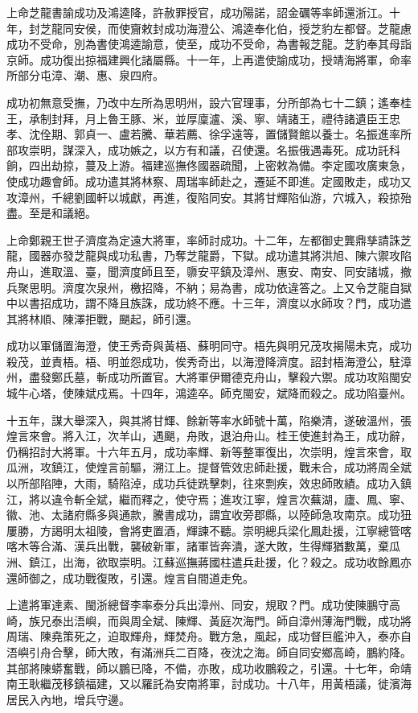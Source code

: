 \begin{pinyinscope}
上命芝龍書諭成功及鴻逵降，許赦罪授官，成功陽諾，詔金礪等率師還浙江。十年，封芝龍同安侯，而使齎敕封成功海澄公、鴻逵奉化伯，授芝豹左都督。芝龍慮成功不受命，別為書使鴻逵諭意，使至，成功不受命，為書報芝龍。芝豹奉其母詣京師。成功復出掠福建興化諸屬縣。十一年，上再遣使諭成功，授靖海將軍，命率所部分屯漳、潮、惠、泉四府。

成功初無意受撫，乃改中左所為思明州，設六官理事，分所部為七十二鎮；遙奉桂王，承制封拜，月上魯王豚、米，並厚廩瀘、溪、寧、靖諸王，禮待諸遺臣王忠孝、沈佺期、郭貞一、盧若騰、華若薦、徐孚遠等，置儲賢館以養士。名振進率所部攻崇明，謀深入，成功嫉之，以方有和議，召使還。名振俄遇毒死。成功託科餉，四出劫掠，蔓及上游。福建巡撫佟國器疏聞，上密敕為備。李定國攻廣東急，使成功趣會師。成功遣其將林察、周瑞率師赴之，遷延不即進。定國敗走，成功又攻漳州，千總劉國軒以城獻，再進，復陷同安。其將甘輝陷仙游，穴城入，殺掠殆盡。至是和議絕。

上命鄭親王世子濟度為定遠大將軍，率師討成功。十二年，左都御史龔鼎孳請誅芝龍，國器亦發芝龍與成功私書，乃奪芝龍爵，下獄。成功遣其將洪旭、陳六禦攻陷舟山，進取溫、臺，聞濟度師且至，隳安平鎮及漳州、惠安、南安、同安諸城，撤兵聚思明。濟度次泉州，檄招降，不納；易為書，成功依違答之。上又令芝龍自獄中以書招成功，謂不降且族誅，成功終不應。十三年，濟度以水師攻？門，成功遣其將林順、陳澤拒戰，颶起，師引還。

成功以軍儲置海澄，使王秀奇與黃梧、蘇明同守。梧先與明兄茂攻揭陽未克，成功殺茂，並責梧。梧、明並怨成功，俟秀奇出，以海澄降濟度。詔封梧海澄公，駐漳州，盡發鄭氏墓，斬成功所置官。大將軍伊爾德克舟山，擊殺六禦。成功攻陷閩安城牛心塔，使陳斌戍焉。十四年，鴻逵卒。師克閩安，斌降而殺之。成功陷臺州。

十五年，謀大舉深入，與其將甘輝、餘新等率水師號十萬，陷樂清，遂破溫州，張煌言來會。將入江，次羊山，遇颶，舟敗，退泊舟山。桂王使進封為王，成功辭，仍稱招討大將軍。十六年五月，成功率輝、新等整軍復出，次崇明，煌言來會，取瓜洲，攻鎮江，使煌言前驅，溯江上。提督管效忠師赴援，戰未合，成功將周全斌以所部陷陣，大雨，騎陷淖，成功兵徒跣擊刺，往來剽疾，效忠師敗績。成功入鎮江，將以違令斬全斌，繼而釋之，使守焉；進攻江寧，煌言次蕪湖，廬、鳳、寧、徽、池、太諸府縣多與通款，騰書成功，謂宜收旁郡縣，以陸師急攻南京。成功狃屢勝，方謁明太祖陵，會將吏置酒，輝諫不聽。崇明總兵梁化鳳赴援，江寧總管喀喀木等合滿、漢兵出戰，襲破新軍，諸軍皆奔潰，遂大敗，生得輝猶數萬，棄瓜洲、鎮江，出海，欲取崇明。江蘇巡撫蔣國柱遣兵赴援，化？殺之。成功收餘鳳亦還師御之，成功戰復敗，引還。煌言自間道走免。

上遣將軍達素、閩浙總督李率泰分兵出漳州、同安，規取？門。成功使陳鵬守高崎，族兄泰出浯嶼，而與周全斌、陳輝、黃庭次海門。師自漳州薄海門戰，成功將周瑞、陳堯策死之，迫取輝舟，輝焚舟。戰方急，風起，成功督巨艦沖入，泰亦自浯嶼引舟合擊，師大敗，有滿洲兵二百降，夜沈之海。師自同安鄉高崎，鵬約降。其部將陳蟒奮戰，師以鵬已降，不備，亦敗，成功收鵬殺之，引還。十七年，命靖南王耿繼茂移鎮福建，又以羅託為安南將軍，討成功。十八年，用黃梧議，徙濱海居民入內地，增兵守邊。


\end{pinyinscope}
